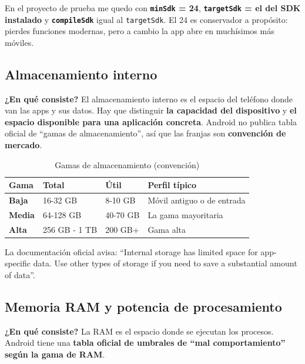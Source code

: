 \documentclass[11pt,a4paper]{article}
\newcommand{\code}[1]{\texttt{\color{navylight}#1}}
\newcommand{\campo}[1]{\textbf{\color{navy}#1}}
\begin{document}
	En el proyecto de prueba me quedo con \textbf{\code{minSdk} = 24}, \textbf{\code{targetSdk} = el del SDK instalado} y \textbf{\code{compileSdk}} igual al \code{targetSdk}. El 24 es conservador a propósito: pierdes funciones modernas, pero a cambio la app abre en muchísimos más móviles.
	
	\subsection{Almacenamiento interno}
	
	\campo{¿En qué consiste?}
	El almacenamiento interno es el espacio del teléfono donde van las apps y sus datos. Hay que distinguir \textbf{la capacidad del dispositivo} y \textbf{el espacio disponible para una aplicación concreta}. Android no publica tabla oficial de \enquote{gamas de almacenamiento}, así que las franjas son \textbf{convención de mercado}.
	
	\begin{table}[htbp]
		\centering
		\small
		\begin{tabularx}{\textwidth}{@{}l l l >{\RaggedRight\arraybackslash}X@{}}
			\toprule
			\rowcolor{primary}
			\textcolor{paper}{\sffamily\bfseries Gama} & \textcolor{paper}{\sffamily\bfseries Total} & \textcolor{paper}{\sffamily\bfseries Útil} & \textcolor{paper}{\sffamily\bfseries Perfil típico} \\
			\midrule
			\textbf{Baja} & 16-32 GB & 8-10 GB & Móvil antiguo o de entrada \\
			\rowcolor{soft}
			\textbf{Media} & 64-128 GB & 40-70 GB & La gama mayoritaria \\
			\textbf{Alta} & 256 GB - 1 TB & 200 GB+ & Gama alta \\
			\bottomrule
		\end{tabularx}
		\caption{Gamas de almacenamiento (convención)}
	\end{table}
	
	La documentación oficial avisa: \enquote{Internal storage has limited space for app-specific data. Use other types of storage if you need to save a substantial amount of data}.
	
	\subsection{Memoria RAM y potencia de procesamiento}
	
	\campo{¿En qué consiste?}
	La RAM es el espacio donde se ejecutan los procesos. Android tiene una \textbf{tabla oficial de umbrales de \enquote{mal comportamiento} según la gama de RAM}.
	
\end{document}
